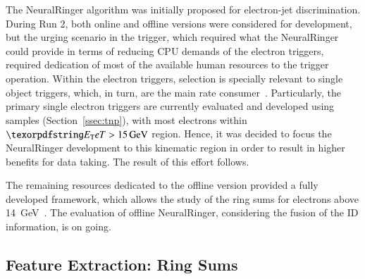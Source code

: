 
The NeuralRinger algorithm was initially proposed for electron-jet discrimination. 
During Run 2, both online and offline versions
were considered for development, but the urging scenario in the trigger, which
required what the NeuralRinger could provide in terms of reducing CPU demands of the
electron triggers, required dedication of most of the available human resources
to the trigger operation. Within the electron triggers, \hlt{} selection is
specially relevant to single object triggers, which, in turn, are the main rate
consumer~\cite{aad2020performance}. Particularly, the primary single electron triggers
are currently evaluated and developed using \Zee{} \tnp{} samples
(Section~\ref{ssec:tnp}), with most electrons within $\et>\SI{15}{\GeV}$ region.
Hence, it was decided to focus the NeuralRinger development to this kinematic region in
order to result in higher benefits for data taking. The result of this effort
follows.

The remaining resources dedicated to the offline version provided a fully
developed framework, which allows the study of the ring sums for electrons above
\SI{14}{\GeV}~\cite{Freund2015}. The evaluation of offline NeuralRinger, considering the
fusion of the ID information, is on going.


\subsection{Feature Extraction: Ring Sums}\label{ssec:concept}

